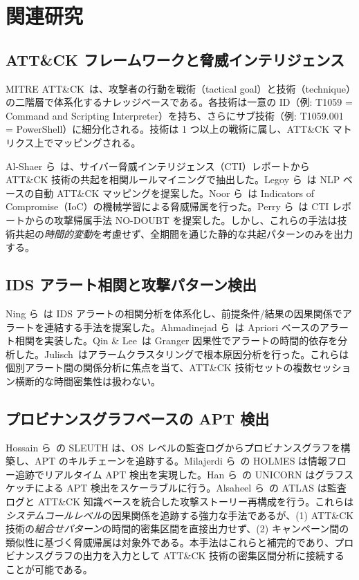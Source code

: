 \documentclass[11pt]{article}
\begin{document}
\section{関連研究}\label{sec:related}

\subsection{ATT\&CK フレームワークと脅威インテリジェンス}

MITRE ATT\&CK~\cite{strom2018mitre}は、攻撃者の行動を戦術（tactical goal）と技術（technique）の二階層で体系化するナレッジベースである。各技術は一意の ID（例: T1059 = Command and Scripting Interpreter）を持ち、さらにサブ技術（例: T1059.001 = PowerShell）に細分化される。技術は 1 つ以上の戦術に属し、ATT\&CK マトリクス上でマッピングされる。

Al-Shaer ら~\cite{alshaer2020learning}は、サイバー脅威インテリジェンス（CTI）レポートから ATT\&CK 技術の共起を相関ルールマイニングで抽出した。Legoy ら~\cite{legoy2020automated}は NLP ベースの自動 ATT\&CK マッピングを提案した。Noor ら~\cite{noor2019machine}は Indicators of Compromise（IoC）の機械学習による脅威帰属を行った。Perry ら~\cite{perry2019shortcuts}は CTI レポートからの攻撃帰属手法 NO-DOUBT を提案した。しかし、これらの手法は技術共起の\emph{時間的変動}を考慮せず、全期間を通じた静的な共起パターンのみを出力する。

\subsection{IDS アラート相関と攻撃パターン検出}

Ning ら~\cite{ning2004techniques}は IDS アラートの相関分析を体系化し、前提条件/結果の因果関係でアラートを連結する手法を提案した。Ahmadinejad ら~\cite{ahmadinejad2009mining}は Apriori ベースのアラート相関を実装した。Qin \& Lee~\cite{qin2004statistical}は Granger 因果性でアラートの時間的依存を分析した。Julisch~\cite{julisch2003clustering}はアラームクラスタリングで根本原因分析を行った。これらは個別アラート間の関係分析に焦点を当て、ATT\&CK 技術セットの複数セッション横断的な時間密集性は扱わない。

\subsection{プロビナンスグラフベースの APT 検出}

Hossain ら~\cite{hossain2017sleuth}の SLEUTH は、OS レベルの監査ログからプロビナンスグラフを構築し、APT のキルチェーンを追跡する。Milajerdi ら~\cite{milajerdi2019holmes}の HOLMES は情報フロー追跡でリアルタイム APT 検出を実現した。Han ら~\cite{han2020unicorn}の UNICORN はグラフスケッチによる APT 検出をスケーラブルに行う。Alsaheel ら~\cite{alsaheel2021atlas}の ATLAS は監査ログと ATT\&CK 知識ベースを統合した攻撃ストーリー再構成を行う。これらは\emph{システムコールレベル}の因果関係を追跡する強力な手法であるが、(1) ATT\&CK 技術の\emph{組合せパターン}の時間的密集区間を直接出力せず、(2) キャンペーン間の類似性に基づく脅威帰属は対象外である。本手法はこれらと補完的であり、プロビナンスグラフの出力を入力として ATT\&CK 技術の密集区間分析に接続することが可能である。
\end{document}
